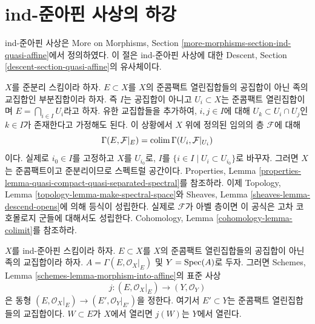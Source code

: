 






\section{ind-준아핀 사상의 하강}
\label{section-ind-quasi-affine}

\noindent
ind-준아핀 사상은 More on Morphisms, Section
\ref{more-morphisms-section-ind-quasi-affine}에서 정의하였다. 이 절은
ind-준아핀 사상에 대한 Descent, Section
\ref{descent-section-quasi-affine}의 유사체이다.

\medskip\noindent
$X$를 준분리 스킴이라 하자. $E \subset X$를 $X$의 준콤팩트 열린집합들의
공집합이 아닌 족의 교집합인 부분집합이라 하자. 즉 $I$는 공집합이 아니고
$U_i \subset X$는 준콤팩트 열린집합이며
$E = \bigcap_{i \in I} U_i$라고 하자. 유한 교집합들을 추가하여,
$i, j \in I$에 대해 $U_k \subset U_i \cap U_j$인 $k \in I$가 존재한다고
가정해도 된다. 이 상황에서 $X$ 위에 정의된 임의의 층 $\mathcal{F}$에 대해
\begin{equation}
\label{equation-sections-of-intersection}
\Gamma(E, \mathcal{F}|_E) = \mathop{\mathrm{colim}}\nolimits \Gamma(U_i, \mathcal{F}|_{U_i})
\end{equation}
이다. 실제로 $i_0 \in I$를 고정하고 $X$를 $U_{i_0}$로,
$I$를 $\{i \in I \mid U_i \subset U_{i_0}\}$로 바꾸자. 그러면 $X$는
준콤팩트이고 준분리이므로 스펙트럴 공간이다. Properties, Lemma
\ref{properties-lemma-quasi-compact-quasi-separated-spectral}를 참조하라.
이제 Topology, Lemma \ref{topology-lemma-make-spectral-space}와 Sheaves, Lemma
\ref{sheaves-lemma-descend-opens}에 의해 등식이 성립한다. 실제로
$\mathcal{F}$가 아벨 층이면 이 공식은 고차 코호몰로지 군들에 대해서도
성립한다. Cohomology, Lemma \ref{cohomology-lemma-colimit}를 참조하라.

\begin{lemma}
\label{lemma-sits-in-functions}
$X$를 ind-준아핀 스킴이라 하자. $E \subset X$를 $X$의 준콤팩트
열린집합들의 공집합이 아닌 족의 교집합이라 하자.
$A = \Gamma(E, \mathcal{O}_X|_E)$ 및 $Y = \mathop{\mathrm{Spec}}(A)$로 두자.
그러면 Schemes, Lemma \ref{schemes-lemma-morphism-into-affine}의 표준 사상
$$
j : (E, \mathcal{O}_X|_E) \longrightarrow (Y, \mathcal{O}_Y)
$$
은 동형 $(E, \mathcal{O}_X|_E) \to (E', \mathcal{O}_Y|_{E'})$을 정한다.
여기서 $E' \subset Y$는 준콤팩트 열린집합들의 교집합이다.
$W \subset E$가 $X$에서 열리면 $j(W)$는 $Y$에서 열린다.
\end{lemma}

